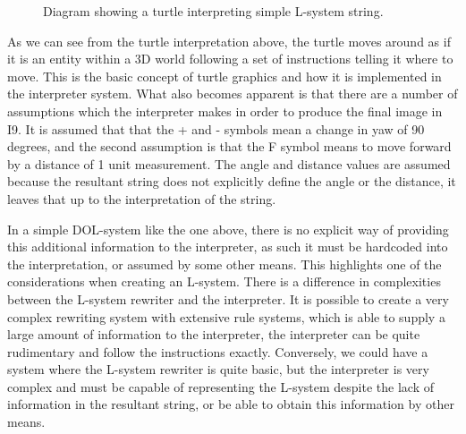 \begin{figure}[htbp]
	{\centering
		\setlength{\fboxrule}{1pt}
		\vspace{7px}
		\caption{Diagram showing a turtle interpreting simple L-system string.} \label{basic turtle}
	}
\end{figure}
\FloatBarrier

\noindent
As we can see from the turtle interpretation above, the turtle moves around as if it is an entity within a 3D world following a set of instructions telling it where to move. This is the basic concept of turtle graphics and how it is implemented in the interpreter system. What also becomes apparent is that there are a number of assumptions which the interpreter makes in order to produce the final image in I9. It is assumed that that the + and - symbols mean a change in yaw of 90 degrees, and the second assumption is that the F symbol means to move forward by a distance of 1 unit measurement. The angle and distance values are assumed because the resultant string does not explicitly define the angle or the distance, it leaves that up to the interpretation of the string. 

In a simple DOL-system like the one above, there is no explicit way of providing this additional information to the interpreter, as such it must be hardcoded into the interpretation, or assumed by some other means. This highlights one of the considerations when creating an L-system. There is a difference in complexities between the L-system rewriter and the interpreter. It is possible to create a very complex rewriting system with extensive rule systems, which is able to supply a large amount of information to the interpreter, the interpreter can be quite rudimentary and follow the instructions exactly. Conversely, we could have a system where the L-system rewriter is quite basic, but the interpreter is very complex and must be capable of representing the L-system despite the lack of information in the resultant string, or be able to obtain this information by other means. 

